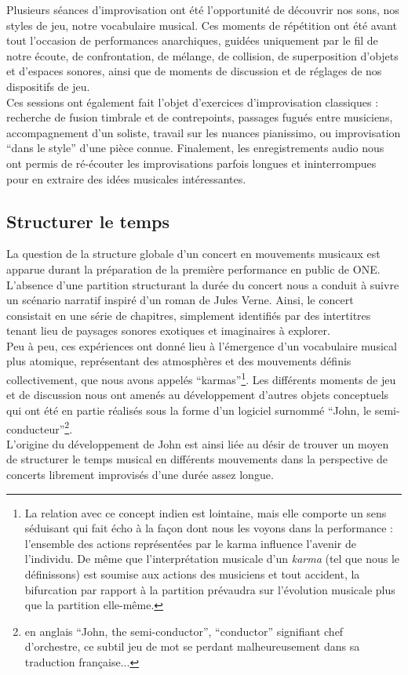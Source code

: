 \noindent Plusieurs séances d'improvisation ont été l'opportunité de découvrir nos sons, nos styles de jeu, notre vocabulaire musical. Ces moments de répétition ont été avant tout l'occasion de performances anarchiques, guidées uniquement par le fil de notre écoute, de confrontation, de mélange, de collision, de superposition d'objets et d'espaces sonores, ainsi que de moments de discussion et de réglages de nos dispositifs de jeu.\\
\indent Ces sessions ont également fait l'objet d'exercices d'improvisation classiques : recherche de fusion timbrale et de contrepoints, passages fugués entre musiciens, accompagnement d'un soliste, travail sur les nuances pianissimo, ou improvisation ``dans le style'' d'une pièce connue. Finalement, les enregistrements audio nous ont permis de ré-écouter les improvisations parfois longues et ininterrompues pour en extraire des idées musicales intéressantes.\\

\subsection{Structurer le temps}

\noindent La question de la structure globale d'un concert en mouvements musicaux est apparue durant la préparation de la première performance en public de ONE. L'absence d'une partition structurant la durée du concert nous a conduit à suivre un scénario narratif inspiré d'un roman de Jules Verne. Ainsi, le concert consistait en une série de chapitres, simplement identifiés par des intertitres tenant lieu de paysages sonores exotiques et imaginaires à explorer.\\
\indent Peu à peu, ces expériences ont donné lieu à l'émergence d'un vocabulaire musical plus atomique, représentant des atmosphères et des mouvements définis collectivement, que nous avons appelés ``karmas''\footnote{La relation avec ce concept indien est lointaine, mais elle comporte un sens séduisant qui fait écho à la façon dont nous les voyons dans la performance : l'ensemble des actions représentées par le karma influence l'avenir de l'individu. De même que l'interprétation musicale d'un \textit{karma} (tel que nous le définissons) est soumise aux actions des musiciens et tout accident, la bifurcation par rapport à la partition prévaudra sur l'évolution musicale plus que la partition elle-même.}. Les différents moments de jeu et de discussion nous ont amenés au développement d'autres objets conceptuels qui ont été en partie réalisés sous la forme d'un logiciel surnommé ``John, le semi-conducteur''\footnote{en anglais ``John, the semi-conductor'', ``conductor'' signifiant chef d'orchestre, ce subtil jeu de mot se perdant malheureusement dans sa traduction française...}.\\
\indent L'origine du développement de John est ainsi liée au désir de trouver un moyen de structurer le temps musical en différents mouvements dans la perspective de concerts librement improvisés d'une durée assez longue. 

